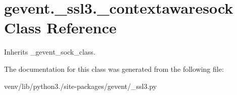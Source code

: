 \hypertarget{classgevent_1_1__ssl3_1_1__contextawaresock}{}\section{gevent.\+\_\+ssl3.\+\_\+contextawaresock Class Reference}
\label{classgevent_1_1__ssl3_1_1__contextawaresock}


Inherits \+\_\+gevent\+\_\+sock\+\_\+class.



The documentation for this class was generated from the following file\+:\begin{DoxyCompactItemize}
\item 
venv/lib/python3./site-\/packages/gevent/\+\_\+ssl3.\+py\end{DoxyCompactItemize}
